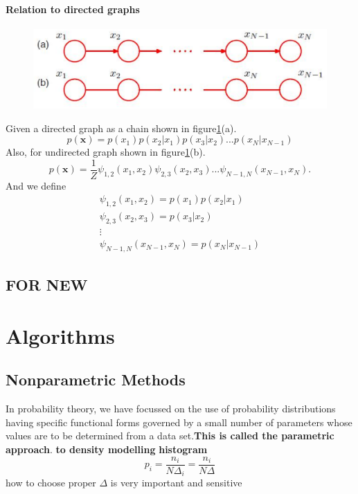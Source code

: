 \documentclass[a4paper]{book}
\renewcommand{\bf}{\mathbf}
\begin{document}
\subsubsection{Relation to directed graphs}
\begin{figure}
  \centering
  \includegraphics[width=\textwidth]{./imgs/GM3.eps}
  \caption{}\label{GM3}
\end{figure}
Given a directed graph as a chain shown in figure\ref{GM3}(a).
\begin{equation}\label{eq8.14}
  p(\bf x) =p(x_1)p(x_2|x_1)p(x_3|x_2)...p(x_N|x_{N-1})
\end{equation}
Also, for undirected graph shown in figure\ref{GM3}(b).
\begin{equation}\label{eq8.15}
  p(\bf x) = \frac{1}{Z}\psi_{1,2}(x_1,x_2)\psi_{2,3}(x_2,x_3)...\psi_{N-1,N}(x_{N-1},x_N).
\end{equation}
And we define
\begin{align}\label{eq8.15}
  \psi_{1,2}(x_1,x_2) = p(x_1)p(x_2|x_1) \\
  \psi_{2,3}(x_2,x_3)=p(x_3|x_2) \\
  \vdots \\
  \psi_{N-1,N}(x_{N-1},x_N) = p(x_N|x_{N-1})
\end{align}






\section{FOR NEW}

\chapter{Algorithms}
\section{Nonparametric Methods}
In probability theory, we have  focussed on the use of probability distributions
having specific functional forms governed by a small number of parameters whose
values are to be determined from a data set.\textbf{This is called the parametric approach}.
\textbf{to density modelling}\newline
\textbf{histogram}
$$p_i = \frac{n_i}{N\Delta_i}=\frac{n_i}{N\Delta}$$
how to choose proper $\Delta$ is very important and sensitive
\end{document}
